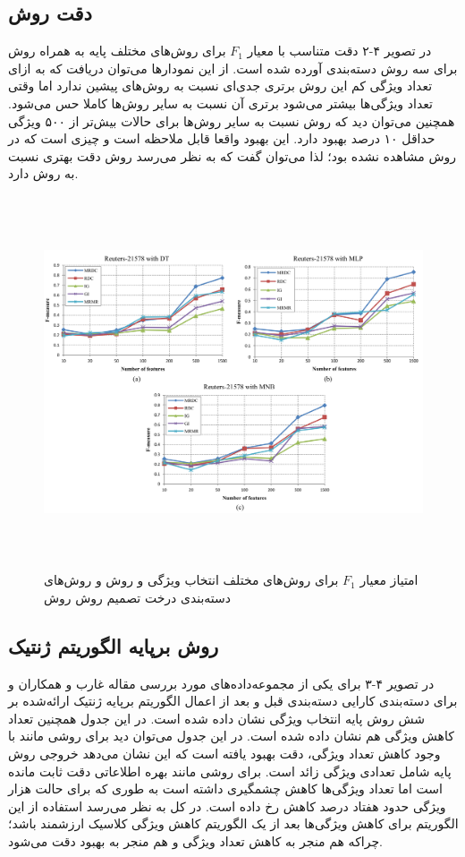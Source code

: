 \subsection{دقت روش }
در تصویر ۴-۲ دقت متناسب با معیار $F_1$ برای روش‌های مختلف پایه به همراه روش  برای سه روش دسته‌بندی آورده شده است. از این نمودارها می‌توان دریافت که به ازای تعداد ویژگی کم این روش برتری جدی‌ای نسبت به روش‌های پیشین ندارد اما وقتی تعداد ویژگی‌ها بیشتر می‌شود برتری آن نسبت به سایر روش‌ها کاملا حس می‌شود. همچنین می‌توان دید که روش  نسبت به سایر روش‌ها برای حالات بیش‌تر از ۵۰۰ ویژگی حداقل ۱۰ درصد بهبود دارد. این بهبود واقعا قابل ملاحظه است و چیزی است که در روش  مشاهده نشده بود؛ لذا می‌توان گفت که به نظر می‌رسد روش  دقت بهتری نسبت به روش  دارد.

\begin{figure}[!h]
\includegraphics[height=11cm]{MRDC1.png}
\caption{امتیاز معیار $F_1$ برای روش‌های مختلف انتخاب ویژگی و روش  و روش‌های دسته‌بندی  درخت تصمیم  روش   روش  \cite{labani2018novel} }
\end{figure}

\subsection{روش برپایه الگوریتم ژنتیک}
در تصویر ۴-۳ برای یکی از مجموعه‌داده‌های مورد بررسی مقاله غارب و همکاران و برای دسته‌بندی  کارایی دسته‌بندی قبل و بعد از اعمال الگوریتم برپایه ژنتیک ارائه‌شده بر شش روش پایه انتخاب ویژگی نشان داده شده است. در این جدول همچنین تعداد کاهش ویژگی هم نشان داده شده است. در این جدول می‌توان دید برای روشی مانند  با وجود کاهش تعداد ویژگی، دقت بهبود یافته است که این نشان می‌دهد خروجی روش پایه شامل تعدادی ویژگی زائد است. برای روشی مانند بهره اطلاعاتی دقت ثابت مانده است اما تعداد ویژگی‌ها کاهش چشمگیری داشته است به طوری که برای حالت هزار ویژگی حدود هفتاد درصد کاهش رخ داده است. در کل به نظر می‌رسد استفاده از این الگوریتم برای کاهش ویژگی‌ها بعد از یک الگوریتم کاهش ویژگی کلاسیک ارزشمند باشد؛ چراکه هم منجر به کاهش تعداد ویژگی‌ و هم منجر به بهبود دقت می‌شود.
\\

